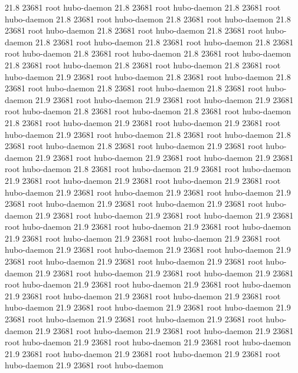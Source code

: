 21.8 23681 root     hubo-daemon
21.8 23681 root     hubo-daemon
21.8 23681 root     hubo-daemon
21.8 23681 root     hubo-daemon
21.8 23681 root     hubo-daemon
21.8 23681 root     hubo-daemon
21.8 23681 root     hubo-daemon
21.8 23681 root     hubo-daemon
21.8 23681 root     hubo-daemon
21.8 23681 root     hubo-daemon
21.8 23681 root     hubo-daemon
21.8 23681 root     hubo-daemon
21.8 23681 root     hubo-daemon
21.8 23681 root     hubo-daemon
21.8 23681 root     hubo-daemon
21.8 23681 root     hubo-daemon
21.9 23681 root     hubo-daemon
21.8 23681 root     hubo-daemon
21.8 23681 root     hubo-daemon
21.8 23681 root     hubo-daemon
21.8 23681 root     hubo-daemon
21.9 23681 root     hubo-daemon
21.9 23681 root     hubo-daemon
21.9 23681 root     hubo-daemon
21.8 23681 root     hubo-daemon
21.8 23681 root     hubo-daemon
21.8 23681 root     hubo-daemon
21.9 23681 root     hubo-daemon
21.9 23681 root     hubo-daemon
21.9 23681 root     hubo-daemon
21.8 23681 root     hubo-daemon
21.8 23681 root     hubo-daemon
21.8 23681 root     hubo-daemon
21.9 23681 root     hubo-daemon
21.9 23681 root     hubo-daemon
21.9 23681 root     hubo-daemon
21.9 23681 root     hubo-daemon
21.8 23681 root     hubo-daemon
21.9 23681 root     hubo-daemon
21.9 23681 root     hubo-daemon
21.9 23681 root     hubo-daemon
21.9 23681 root     hubo-daemon
21.9 23681 root     hubo-daemon
21.9 23681 root     hubo-daemon
21.9 23681 root     hubo-daemon
21.9 23681 root     hubo-daemon
21.9 23681 root     hubo-daemon
21.9 23681 root     hubo-daemon
21.9 23681 root     hubo-daemon
21.9 23681 root     hubo-daemon
21.9 23681 root     hubo-daemon
21.9 23681 root     hubo-daemon
21.9 23681 root     hubo-daemon
21.9 23681 root     hubo-daemon
21.9 23681 root     hubo-daemon
21.9 23681 root     hubo-daemon
21.9 23681 root     hubo-daemon
21.9 23681 root     hubo-daemon
21.9 23681 root     hubo-daemon
21.9 23681 root     hubo-daemon
21.9 23681 root     hubo-daemon
21.9 23681 root     hubo-daemon
21.9 23681 root     hubo-daemon
21.9 23681 root     hubo-daemon
21.9 23681 root     hubo-daemon
21.9 23681 root     hubo-daemon
21.9 23681 root     hubo-daemon
21.9 23681 root     hubo-daemon
21.9 23681 root     hubo-daemon
21.9 23681 root     hubo-daemon
21.9 23681 root     hubo-daemon
21.9 23681 root     hubo-daemon
21.9 23681 root     hubo-daemon
21.9 23681 root     hubo-daemon
21.9 23681 root     hubo-daemon
21.9 23681 root     hubo-daemon
21.9 23681 root     hubo-daemon
21.9 23681 root     hubo-daemon
21.9 23681 root     hubo-daemon
21.9 23681 root     hubo-daemon
21.9 23681 root     hubo-daemon
21.9 23681 root     hubo-daemon
